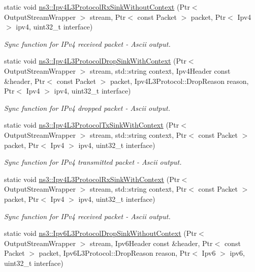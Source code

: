 \begin{DoxyCompactItemize}
static void \hyperlink{namespacens3_ab7f559cb75bca820ec86b2be4523b8bf}{ns3\+::\+Ipv4\+L3\+Protocol\+Rx\+Sink\+Without\+Context} (Ptr$<$ Output\+Stream\+Wrapper $>$ stream, Ptr$<$ const Packet $>$ packet, Ptr$<$ Ipv4 $>$ ipv4, uint32\+\_\+t interface)
\begin{DoxyCompactList}\small\item\em Sync function for I\+Pv4 received packet -\/ Ascii output. \end{DoxyCompactList}\item 
static void \hyperlink{namespacens3_ab731704e54609d989a8b5ab8790f5948}{ns3\+::\+Ipv4\+L3\+Protocol\+Drop\+Sink\+With\+Context} (Ptr$<$ Output\+Stream\+Wrapper $>$ stream, std\+::string context, Ipv4\+Header const \&header, Ptr$<$ const Packet $>$ packet, Ipv4\+L3\+Protocol\+::\+Drop\+Reason reason, Ptr$<$ Ipv4 $>$ ipv4, uint32\+\_\+t interface)
\begin{DoxyCompactList}\small\item\em Sync function for I\+Pv4 dropped packet -\/ Ascii output. \end{DoxyCompactList}\item 
static void \hyperlink{namespacens3_ae5c3b272528df0f20c90e9619ae8d4c1}{ns3\+::\+Ipv4\+L3\+Protocol\+Tx\+Sink\+With\+Context} (Ptr$<$ Output\+Stream\+Wrapper $>$ stream, std\+::string context, Ptr$<$ const Packet $>$ packet, Ptr$<$ Ipv4 $>$ ipv4, uint32\+\_\+t interface)
\begin{DoxyCompactList}\small\item\em Sync function for I\+Pv4 transmitted packet -\/ Ascii output. \end{DoxyCompactList}\item 
static void \hyperlink{namespacens3_a861f020898d092a9027edf46576a4033}{ns3\+::\+Ipv4\+L3\+Protocol\+Rx\+Sink\+With\+Context} (Ptr$<$ Output\+Stream\+Wrapper $>$ stream, std\+::string context, Ptr$<$ const Packet $>$ packet, Ptr$<$ Ipv4 $>$ ipv4, uint32\+\_\+t interface)
\begin{DoxyCompactList}\small\item\em Sync function for I\+Pv4 received packet -\/ Ascii output. \end{DoxyCompactList}\item 
static void \hyperlink{namespacens3_a7ced21c98bc6aea53aacc04207dcf51c}{ns3\+::\+Ipv6\+L3\+Protocol\+Drop\+Sink\+Without\+Context} (Ptr$<$ Output\+Stream\+Wrapper $>$ stream, Ipv6\+Header const \&header, Ptr$<$ const Packet $>$ packet, Ipv6\+L3\+Protocol\+::\+Drop\+Reason reason, Ptr$<$ Ipv6 $>$ ipv6, uint32\+\_\+t interface)

\end{DoxyCompactItemize}
